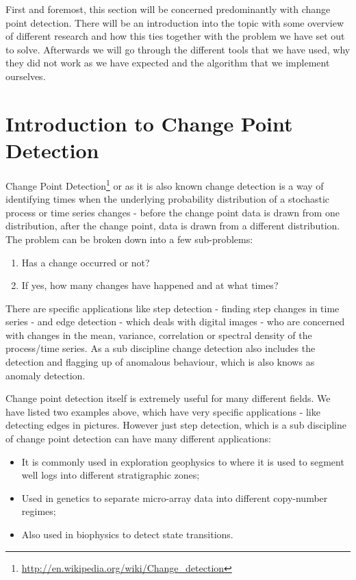 \documentclass[minf,twoside,singlespacing,parskip,notimes,deptreport]{infthesis} %
\begin{document}
First and foremost, this section will be concerned predominantly with change point detection. There will be an introduction into the topic with some overview of different research and how this ties together with the problem we have set out to solve. Afterwards we will go through the different tools that we have used, why they did not work as we have expected and the algorithm that we implement ourselves. 


\section{Introduction to Change Point Detection}


Change Point Detection\footnote{\url{http://en.wikipedia.org/wiki/Change_detection}} or as it is also known change detection is a way of identifying times when the underlying probability distribution of a stochastic process or time series changes - before the change point data is drawn from one distribution, after the change point, data is drawn from a different distribution. The problem can be broken down into a few sub-problems:
\begin{enumerate}
\item Has a change occurred or not?
\item If yes, how many changes have happened and at what times?
\end{enumerate}

There are specific applications like step detection - finding step changes in time series - and edge detection - which deals with digital images - who are concerned with changes in the mean, variance, correlation or spectral density of the process/time series. As a sub discipline change detection also includes the detection and flagging up of anomalous behaviour, which is also knows as anomaly detection. 

Change point detection itself is extremely useful for many different fields. We have listed two examples above, which have very specific applications - like detecting edges in pictures. However just step detection, which is a sub discipline of change point detection can have many different applications:
\begin{itemize}
\item It is commonly used in exploration geophysics to where it is used to segment well logs into different stratigraphic zones;
\item Used in genetics to separate micro-array data into different copy-number regimes;
\item Also used in biophysics to detect state transitions.
\end{itemize}
 
\end{document}
